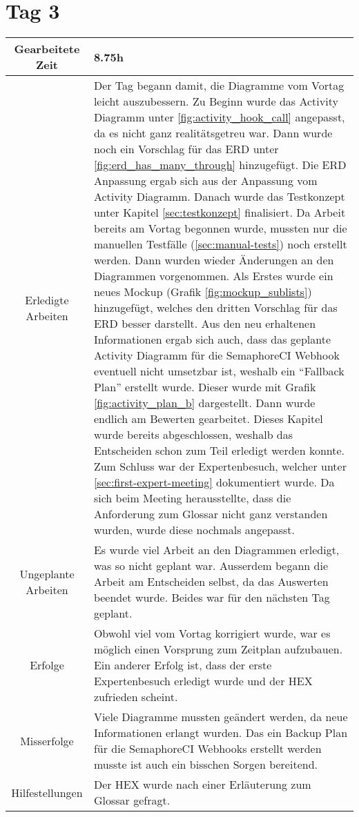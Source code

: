 \section{Tag 3}
\begin{tabularx}{\textwidth}[H]{|c|X|}
  \hline
  Gearbeitete Zeit & 8.75h \\ \hline
  Erledigte Arbeiten & Der Tag begann damit, die Diagramme vom Vortag leicht auszubessern. Zu
  Beginn wurde das Activity Diagramm unter \ref{fig:activity_hook_call} angepasst, da es nicht
  ganz realitätsgetreu war. Dann wurde noch ein Vorschlag für das ERD unter
  \ref{fig:erd_has_many_through} hinzugefügt. Die ERD Anpassung ergab sich aus der Anpassung
  vom Activity Diagramm. \newline
  Danach wurde das Testkonzept unter Kapitel \ref{sec:testkonzept} finalisiert. Da Arbeit bereits
  am Vortag begonnen wurde, mussten nur die manuellen Testfälle (\ref{sec:manual-tests}) noch erstellt
  werden. \newline
  Dann wurden wieder Änderungen an den Diagrammen vorgenommen. Als Erstes wurde ein neues Mockup
  (Grafik \ref{fig:mockup_sublists}) hinzugefügt, welches den dritten Vorschlag für das ERD
  besser darstellt. Aus den neu erhaltenen Informationen ergab sich auch, dass das geplante Activity Diagramm
  für die SemaphoreCI Webhook eventuell nicht umsetzbar ist, weshalb ein \enquote{Fallback Plan}
  erstellt wurde. Dieser wurde mit Grafik \ref{fig:activity_plan_b} dargestellt. \newline
  Dann wurde endlich am Bewerten gearbeitet. Dieses Kapitel wurde bereits abgeschlossen, weshalb
  das Entscheiden schon zum Teil erledigt werden konnte. \newline
  Zum Schluss war der Expertenbesuch, welcher unter \ref{sec:first-expert-meeting} dokumentiert wurde.
  Da sich beim Meeting herausstellte, dass die Anforderung zum Glossar nicht ganz verstanden wurden,
  wurde diese nochmals angepasst. \\ \hline
  Ungeplante Arbeiten & Es wurde viel Arbeit an den Diagrammen erledigt, was so nicht geplant war. Ausserdem
  begann die Arbeit am Entscheiden selbst, da das Auswerten beendet wurde. Beides war für den nächsten Tag
  geplant. \\ \hline
  Erfolge & Obwohl viel vom Vortag korrigiert wurde, war es möglich einen Vorsprung zum Zeitplan aufzubauen.
  Ein anderer Erfolg ist, dass der erste Expertenbesuch erledigt wurde und der HEX zufrieden scheint. \\ \hline
  Misserfolge & Viele Diagramme mussten geändert werden, da neue Informationen erlangt wurden. Das ein Backup
  Plan für die SemaphoreCI Webhooks erstellt werden musste ist auch ein bisschen Sorgen bereitend. \\ \hline
  Hilfestellungen & Der HEX wurde nach einer Erläuterung zum Glossar gefragt. \\ \hline
\end{tabularx}

